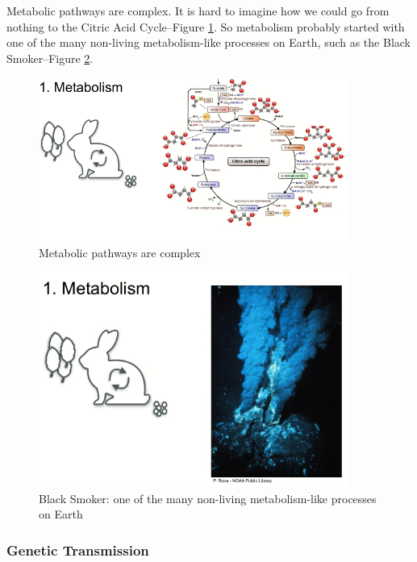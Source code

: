 \documentclass[]{article}
\begin{document}
Metabolic pathways are complex. It is hard to imagine how we could go from nothing to the Citric Acid Cycle--Figure \ref{fig:CitricAcidCycle}. So metabolism probably started with one of the many non-living metabolism-like processes on Earth, such as the Black Smoker--Figure \ref{fig:BlackSmoker}.
\begin{figure}[H]
	\caption{Metabolic pathways are complex}\label{fig:CitricAcidCycle}
	\includegraphics[width=0.9\textwidth]{CitricAcidCycle}
\end{figure}

\begin{figure}[H]
	\caption{Black Smoker: one of the many non-living metabolism-like processes on Earth}\label{fig:BlackSmoker}
	\includegraphics[width=0.9\textwidth]{BlackSmoker}
\end{figure}

\subsubsection{Genetic Transmission}
\end{document}
